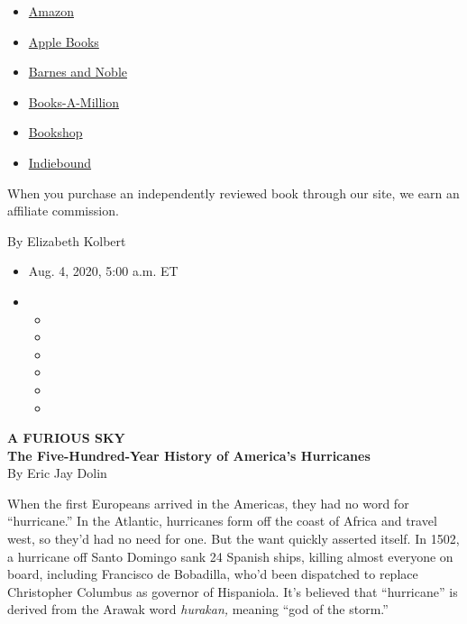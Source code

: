 \begin{itemize}
\tightlist
\item
  \href{https://www.amazon.com/gp/search?index=books\&tag=NYTBSREV-20\&field-keywords=A+Furious+Sky+Eric+Jay+Dolan}{Amazon}
\item
  \href{https://du-gae-books-dot-nyt-du-prd.appspot.com/buy?title=A+Furious+Sky\&author=Eric+Jay+Dolan}{Apple
  Books}
\item
  \href{https://www.anrdoezrs.net/click-7990613-11819508?url=https\%3A\%2F\%2Fwww.barnesandnoble.com\%2Fw\%2F\%3Fean\%3D1631495275}{Barnes
  and Noble}
\item
  \href{https://www.anrdoezrs.net/click-7990613-35140?url=https\%3A\%2F\%2Fwww.booksamillion.com\%2Fp\%2FA\%2BFurious\%2BSky\%2FEric\%2BJay\%2BDolan\%2F1631495275}{Books-A-Million}
\item
  \href{https://bookshop.org/a/3546/1631495275}{Bookshop}
\item
  \href{https://www.indiebound.org/book/1631495275?aff=NYT}{Indiebound}
\end{itemize}

When you purchase an independently reviewed book through our site, we
earn an affiliate commission.

By Elizabeth Kolbert

\begin{itemize}
\item
  Aug. 4, 2020, 5:00 a.m. ET
\item
  \begin{itemize}
  \item
  \item
  \item
  \item
  \item
  \item
  \end{itemize}
\end{itemize}

\textbf{A FURIOUS SKY}\\
\textbf{The Five-Hundred-Year History of America's Hurricanes}\\
By Eric Jay Dolin

When the first Europeans arrived in the Americas, they had no word for
``hurricane.'' In the Atlantic, hurricanes form off the coast of Africa
and travel west, so they'd had no need for one. But the want quickly
asserted itself. In 1502, a hurricane off Santo Domingo sank 24 Spanish
ships, killing almost everyone on board, including Francisco de
Bobadilla, who'd been dispatched to replace Christopher Columbus as
governor of Hispaniola. It's believed that ``hurricane'' is derived from
the Arawak word \emph{hurakan,} meaning ``god of the storm.''

